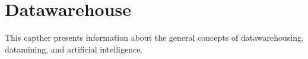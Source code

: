 \section{Datawarehouse}
This capther presents information about the general concepts of datawarehousing, datamining, and artificial intelligence. 